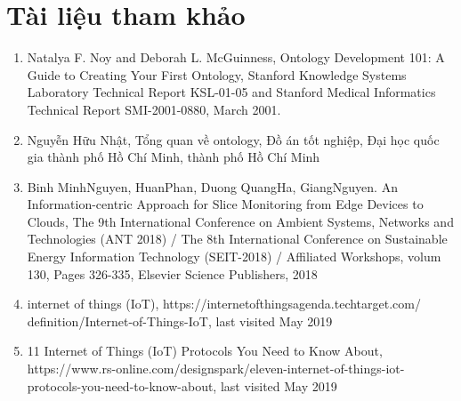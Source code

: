 \clearpage

\chapter{Tài liệu tham khảo}

\begin{enumerate}
	\item  Natalya F. Noy and Deborah L. McGuinness, Ontology Development 101: A Guide to Creating Your First Ontology, Stanford Knowledge Systems Laboratory Technical Report KSL-01-05 and Stanford Medical Informatics Technical Report SMI-2001-0880, March 2001. 
	\item Nguyễn Hữu Nhật, Tổng quan về ontology, Đồ án tốt nghiệp, Đại học quốc gia thành phố Hồ Chí Minh, thành phố Hồ Chí Minh
	\item Binh MinhNguyen, HuanPhan, Duong QuangHa, GiangNguyen. An Information-centric Approach for Slice Monitoring from Edge Devices to Clouds, The 9th International Conference on Ambient Systems, Networks and Technologies (ANT 2018) / The 8th International Conference on Sustainable Energy Information Technology (SEIT-2018) / Affiliated Workshops, volum 130, Pages 326-335, Elsevier Science Publishers, 2018
	\item internet of things (IoT), https://internetofthingsagenda.techtarget.com/
	definition/Internet-of-Things-IoT, last visited May 2019
	\item 11 Internet of Things (IoT) Protocols You Need to Know About, https://www.rs-online.com/designspark/eleven-internet-of-things-iot-protocols-you-need-to-know-about, last visited May 2019
\end{enumerate}


